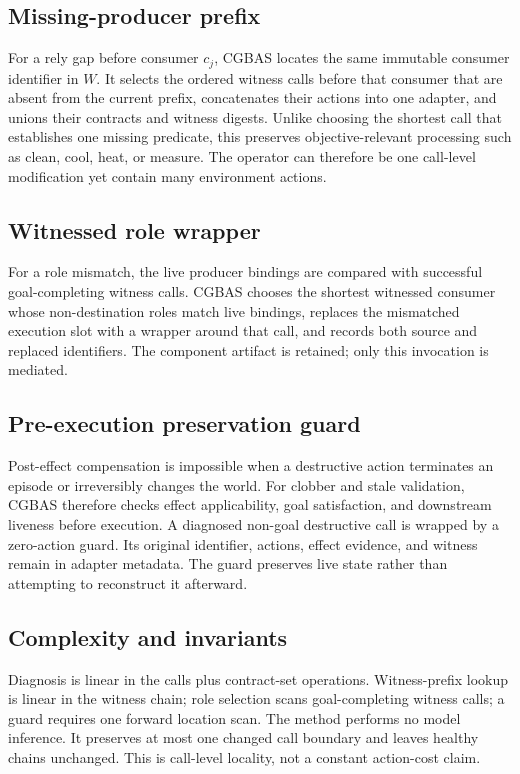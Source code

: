 \documentclass[10pt]{article}
\begin{document}
\subsection{Missing-producer prefix}
For a rely gap before consumer $c_j$, CGBAS locates the same immutable consumer
identifier in $W$. It selects the ordered witness calls before that consumer that
are absent from the current prefix, concatenates their actions into one adapter,
and unions their contracts and witness digests. Unlike choosing the shortest call
that establishes one missing predicate, this preserves objective-relevant
processing such as clean, cool, heat, or measure. The operator can therefore be
one call-level modification yet contain many environment actions.

\subsection{Witnessed role wrapper}
For a role mismatch, the live producer bindings are compared with successful
goal-completing witness calls. CGBAS chooses the shortest witnessed consumer whose
non-destination roles match live bindings, replaces the mismatched execution slot
with a wrapper around that call, and records both source and replaced identifiers.
The component artifact is retained; only this invocation is mediated.

\subsection{Pre-execution preservation guard}
Post-effect compensation is impossible when a destructive action terminates an
episode or irreversibly changes the world. For clobber and stale validation,
CGBAS therefore checks effect applicability, goal satisfaction, and downstream
liveness before execution. A diagnosed non-goal destructive call is wrapped by a
zero-action guard. Its original identifier, actions, effect evidence, and witness
remain in adapter metadata. The guard preserves live state rather than attempting
to reconstruct it afterward.

\subsection{Complexity and invariants}
Diagnosis is linear in the calls plus contract-set operations. Witness-prefix
lookup is linear in the witness chain; role selection scans goal-completing witness
calls; a guard requires one forward location scan. The method performs no model
inference. It preserves at most one changed call boundary and leaves healthy
chains unchanged. This is call-level locality, not a constant action-cost claim.
\end{document}
